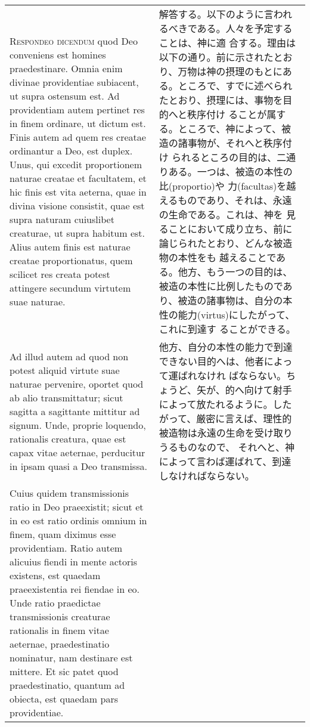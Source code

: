 \documentclass[10pt]{jsarticle} %
\begin{document}
\begin{longtable}{p{21em}p{21em}}
\\


{\scshape Respondeo dicendum} quod Deo conveniens est
homines praedestinare. Omnia enim divinae providentiae subiacent, ut
supra ostensum est. Ad providentiam autem pertinet res in finem
ordinare, ut dictum est. Finis autem ad quem res creatae ordinantur a
Deo, est duplex. Unus, qui excedit proportionem naturae creatae et
facultatem, et hic finis est vita aeterna, quae in divina visione
consistit, quae est supra naturam cuiuslibet creaturae, ut supra habitum
est. Alius autem finis est naturae creatae proportionatus, quem scilicet
res creata potest attingere secundum virtutem suae naturae. 

 
&

解答する。以下のように言われるべきである。人々を予定することは、神に適
合する。理由は以下の通り。前に示されたとおり、万物は神の摂理のもとにあ
る。ところで、すでに述べられたとおり、摂理には、事物を目的へと秩序付け
ることが属する。ところで、神によって、被造の諸事物が、それへと秩序付け
られるところの目的は、二通りある。一つは、被造の本性の比(proportio)や
力(facultas)を越えるものであり、それは、永遠の生命である。これは、神を
見ることにおいて成り立ち、前に論じられたとおり、どんな被造物の本性をも
越えることである。他方、もう一つの目的は、被造の本性に比例したものであ
り、被造の諸事物は、自分の本性の能力(virtus)にしたがって、これに到達す
ることができる。




\\


Ad illud
autem ad quod non potest aliquid virtute suae naturae pervenire, oportet
quod ab alio transmittatur; sicut sagitta a sagittante mittitur ad
signum. Unde, proprie loquendo, rationalis creatura, quae est capax
vitae aeternae, perducitur in ipsam quasi a Deo transmissa. 

 
&

他方、自分の本性の能力で到達できない目的へは、他者によって運ばれなけれ
ばならない。ちょうど、矢が、的へ向けて射手によって放たれるように。した
がって、厳密に言えば、理性的被造物は永遠の生命を受け取りうるものなので、
それへと、神によって言わば運ばれて、到達しなければならない。


\\


Cuius quidem
transmissionis ratio in Deo praeexistit; sicut et in eo est ratio
ordinis omnium in finem, quam diximus esse providentiam. Ratio autem
alicuius fiendi in mente actoris existens, est quaedam praeexistentia
rei fiendae in eo. Unde ratio praedictae transmissionis creaturae
rationalis in finem vitae aeternae, praedestinatio nominatur, nam
destinare est mittere. Et sic patet quod praedestinatio, quantum ad
obiecta, est quaedam pars providentiae.



\end{longtable}
\end{document}
